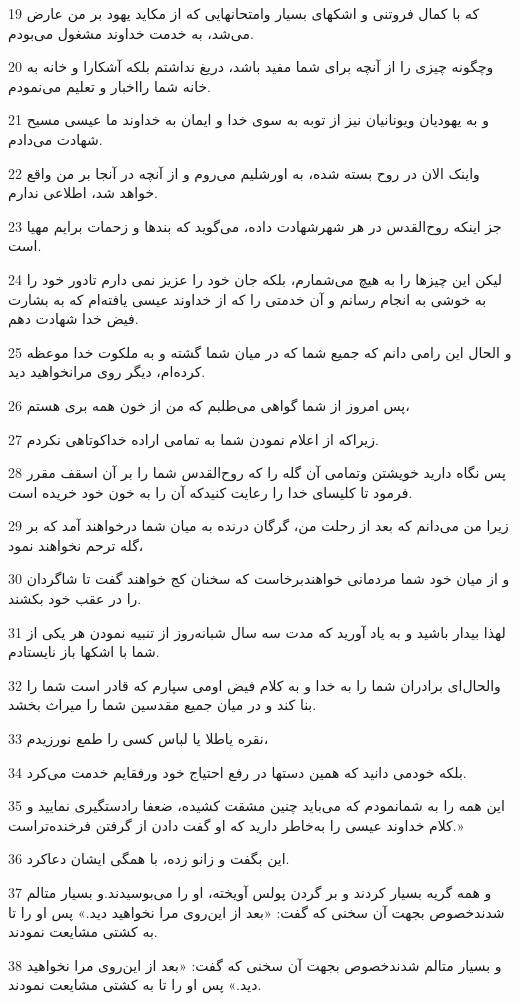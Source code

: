 \par 19 که با کمال فروتنی و اشکهای بسیار وامتحانهایی که از مکاید یهود بر من عارض می‌شد، به خدمت خداوند مشغول می‌بودم.
\par 20 وچگونه چیزی را از آنچه برای شما مفید باشد، دریغ نداشتم بلکه آشکارا و خانه به خانه شما رااخبار و تعلیم می‌نمودم.
\par 21 و به یهودیان ویونانیان نیز از توبه به سوی خدا و ایمان به خداوند ما عیسی مسیح شهادت می‌دادم.
\par 22 واینک الان در روح بسته شده، به اورشلیم می‌روم و از آنچه در آنجا بر من واقع خواهد شد، اطلاعی ندارم.
\par 23 جز اینکه روح‌القدس در هر شهرشهادت داده، می‌گوید که بندها و زحمات برایم مهیا است.
\par 24 لیکن این چیزها را به هیچ می‌شمارم، بلکه جان خود را عزیز نمی دارم تادور خود را به خوشی به انجام رسانم و آن خدمتی را که از خداوند عیسی یافته‌ام که به بشارت فیض خدا شهادت دهم.
\par 25 و الحال این رامی دانم که جمیع شما که در میان شما گشته و به ملکوت خدا موعظه کرده‌ام، دیگر روی مرانخواهید دید.
\par 26 پس امروز از شما گواهی می‌طلبم که من از خون همه بری هستم،
\par 27 زیراکه از اعلام نمودن شما به تمامی اراده خداکوتاهی نکردم.
\par 28 پس نگاه دارید خویشتن وتمامی آن گله را که روح‌القدس شما را بر آن اسقف مقرر فرمود تا کلیسای خدا را رعایت کنیدکه آن را به خون خود خریده است.
\par 29 زیرا من می‌دانم که بعد از رحلت من، گرگان درنده به میان شما درخواهند آمد که بر گله ترحم نخواهند نمود،
\par 30 و از میان خود شما مردمانی خواهندبرخاست که سخنان کج خواهند گفت تا شاگردان را در عقب خود بکشند.
\par 31 لهذا بیدار باشید و به یاد آورید که مدت سه سال شبانه‌روز از تنبیه نمودن هر یکی از شما با اشکها باز نایستادم.
\par 32 والحال‌ای برادران شما را به خدا و به کلام فیض اومی سپارم که قادر است شما را بنا کند و در میان جمیع مقدسین شما را میراث بخشد.
\par 33 نقره یاطلا یا لباس کسی را طمع نورزیدم،
\par 34 بلکه خودمی دانید که همین دستها در رفع احتیاج خود ورفقایم خدمت می‌کرد.
\par 35 این همه را به شمانمودم که می‌باید چنین مشقت کشیده، ضعفا رادستگیری نمایید و کلام خداوند عیسی را به‌خاطر دارید که او گفت دادن از گرفتن فرخنده‌تراست.»
\par 36 این بگفت و زانو زده، با همگی ایشان دعاکرد.
\par 37 و همه گریه بسیار کردند و بر گردن پولس آویخته، او را می‌بوسیدند.و بسیار متالم شدندخصوص بجهت آن سخنی که گفت: «بعد از این‌روی مرا نخواهید دید.» پس او را تا به کشتی مشایعت نمودند.
\par 38 و بسیار متالم شدندخصوص بجهت آن سخنی که گفت: «بعد از این‌روی مرا نخواهید دید.» پس او را تا به کشتی مشایعت نمودند.

